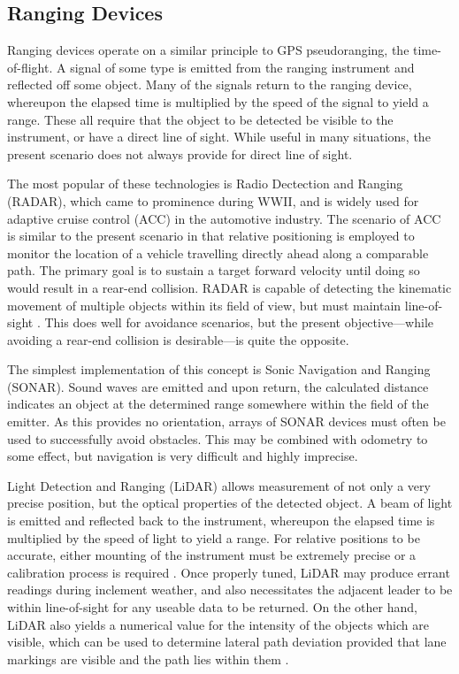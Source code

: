 \documentclass[12pt]{report}
\begin{document}
\subsection{Ranging Devices}
Ranging devices operate on a similar principle to GPS pseudoranging, the time-of-flight. A signal of some type is emitted from the ranging instrument and reflected off some object. Many of the signals return to the ranging device, whereupon the elapsed time is multiplied by the speed of the signal to yield a range. These all require that the object to be detected be visible to the instrument, or have a direct line of sight. While useful in many situations, the present scenario does not always provide for direct line of sight.

The most popular of these technologies is Radio Dectection and Ranging (RADAR), which came to prominence during WWII, and is widely used for adaptive cruise control (ACC) in the automotive industry. The scenario of ACC is similar to the present scenario in that relative positioning is employed to monitor the location of a vehicle travelling directly ahead along a comparable path. The primary goal is to sustain a target forward velocity until doing so would result in a rear-end collision.  RADAR is capable of detecting the kinematic movement of multiple objects within its field of view, but must maintain line-of-sight \cite{lidarvsradaracc}. This does well for avoidance scenarios, but the present objective---while avoiding a rear-end collision is desirable---is quite the opposite.

The simplest implementation of this concept is Sonic Navigation and Ranging (SONAR). Sound waves are emitted and upon return, the calculated distance indicates an object at the determined range somewhere within the field of the emitter. As this provides no orientation, arrays of SONAR devices must often be used to successfully avoid obstacles. This may be combined with odometry to some effect, but navigation is very difficult and highly imprecise.

Light Detection and Ranging (LiDAR) allows measurement of not only a very precise position, but the optical properties of the detected object. A beam of light is emitted and reflected back to the instrument, whereupon the elapsed time is multiplied by the speed of light to yield a range. For relative positions to be accurate, either mounting of the instrument must be extremely precise or a calibration process is required \cite{jordanlidar}. Once properly tuned, LiDAR may produce errant readings during inclement weather, and also necessitates the adjacent leader to be within line-of-sight for any useable data to be returned. On the other hand, LiDAR also yields a numerical value for the intensity of the objects which are visible, which can be used to determine lateral path deviation provided that lane markings are visible and the path lies within them \cite{cameralidarlane}. 
\end{document}
